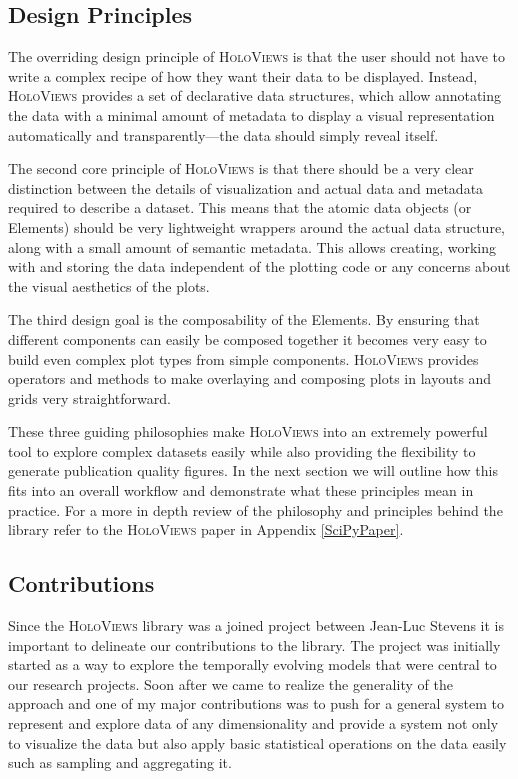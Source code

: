 \subsection{Design Principles}

The overriding design principle of \textsc{HoloViews} is that the user
should not have to write a complex recipe of how they want their data
to be displayed. Instead, \textsc{HoloViews} provides a set of
declarative data structures, which allow annotating the data with a
minimal amount of metadata to display a visual representation
automatically and transparently---the data should simply reveal
itself.

The second core principle of \textsc{HoloViews} is that there should
be a very clear distinction between the details of visualization and
actual data and metadata required to describe a dataset. This means
that the atomic data objects (or Elements) should be very lightweight
wrappers around the actual data structure, along with a small amount
of semantic metadata. This allows creating, working with and storing
the data independent of the plotting code or any concerns about the
visual aesthetics of the plots.

The third design goal is the composability of the Elements. By
ensuring that different components can easily be composed together it
becomes very easy to build even complex plot types from simple
components. \textsc{HoloViews} provides operators and methods to make
overlaying and composing plots in layouts and grids very
straightforward.

These three guiding philosophies make \textsc{HoloViews} into an
extremely powerful tool to explore complex datasets easily while also
providing the flexibility to generate publication quality figures. In
the next section we will outline how this fits into an overall
workflow and demonstrate what these principles mean in practice. For a
more in depth review of the philosophy and principles behind the
library refer to the \textsc{HoloViews} paper in Appendix
\ref{SciPyPaper}.

\subsection{Contributions}

Since the \textsc{HoloViews} library was a joined project between
Jean-Luc Stevens it is important to delineate our contributions to the
library. The project was initially started as a way to explore the
temporally evolving models that were central to our research
projects. Soon after we came to realize the generality of the approach
and one of my major contributions was to push for a general system to
represent and explore data of any dimensionality and provide a system
not only to visualize the data but also apply basic statistical
operations on the data easily such as sampling and aggregating it.

